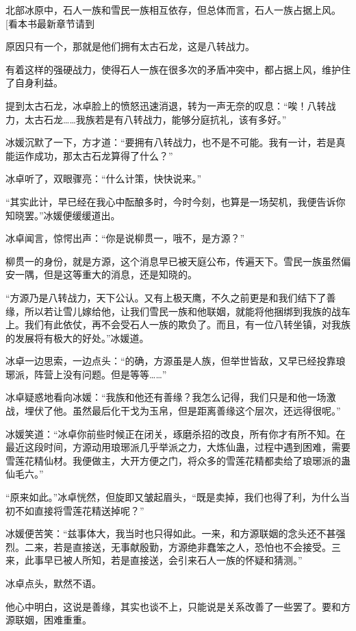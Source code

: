 \begin{this_body}
北部冰原中，石人一族和雪民一族相互依存，但总体而言，石人一族占据上风。[看本书最新章节请到

原因只有一个，那就是他们拥有太古石龙，这是八转战力。

有着这样的强硬战力，使得石人一族在很多次的矛盾冲突中，都占据上风，维护住了自身利益。

提到太古石龙，冰卓脸上的愤怒迅速消退，转为一声无奈的叹息：“唉！八转战力，太古石龙……我族若是有八转战力，能够分庭抗礼，该有多好。”

冰媛沉默了一下，方才道：“要拥有八转战力，也不是不可能。我有一计，若是真能运作成功，那太古石龙算得了什么？”

冰卓听了，双眼骤亮：“什么计策，快快说来。”

“其实此计，早已经在我心中酝酿多时，今时今刻，也算是一场契机，我便告诉你知晓罢。”冰媛便缓缓道出。

冰卓闻言，惊愕出声：“你是说柳贯一，哦不，是方源？”

柳贯一的身份，就是方源，这个消息早已被天庭公布，传遍天下。雪民一族虽然偏安一隅，但是这等重大的消息，还是知晓的。

“方源乃是八转战力，天下公认。又有上极天鹰，不久之前更是和我们结下了善缘，所以若让雪儿嫁给他，让我们雪民一族和他联姻，就能将他捆绑到我族的战车上。我们有此依仗，再不会受石人一族的欺负了。而且，有一位八转坐镇，对我族的发展将有极大的好处。”冰媛道。

冰卓一边思索，一边点头：“的确，方源虽是人族，但举世皆敌，又早已经投靠琅琊派，阵营上没有问题。但是等等……”

冰卓疑惑地看向冰媛：“我族和他还有善缘？我怎么记得，我们只是和他一场激战，埋伏了他。虽然最后化干戈为玉帛，但是距离善缘这个层次，还远得很呢。”

冰媛笑道：“冰卓你前些时候正在闭关，琢磨杀招的改良，所有你才有所不知。在最近这段时间，方源动用琅琊派几乎举派之力，大炼仙蛊，过程中遇到困难，需要雪莲花精仙材。我便做主，大开方便之门，将众多的雪莲花精都卖给了琅琊派的蛊仙毛六。”

“原来如此。”冰卓恍然，但旋即又皱起眉头，“既是卖掉，我们也得了利，为什么当初不如直接将雪莲花精送掉呢？”

冰媛便苦笑：“兹事体大，我当时也只得如此。一来，和方源联姻的念头还不甚强烈。二来，若是直接送，无事献殷勤，方源绝非蠢笨之人，恐怕也不会接受。三来，此事早已被人所知，若是直接送，会引来石人一族的怀疑和猜测。”

冰卓点头，默然不语。

他心中明白，这说是善缘，其实也谈不上，只能说是关系改善了一些罢了。要和方源联姻，困难重重。


\end{this_body}
